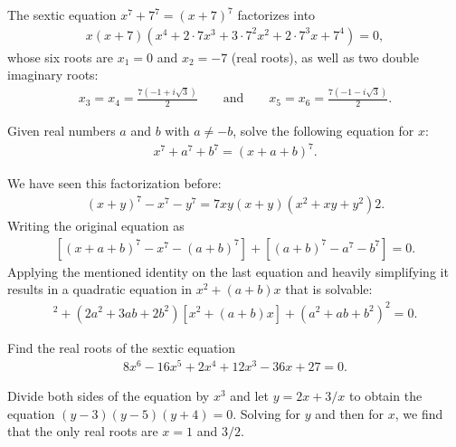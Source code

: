 \begin{solution}
    The sextic equation $x^7+7^7=(x+7)^7$ factorizes into
    \begin{align*}
        x(x+7)(x^4+2\cdot 7x^3 + 3 \cdot 7^2x^2 + 2 \cdot 7^3x + 7^4)=0,
    \end{align*}
    whose six roots are $x_1=0$ and $x_2=-7$ (real roots), as well as two double imaginary roots:
    \begin{align*}
        x_3=x_4=\frac{7(-1+i\sqrt 3)}{2} \qquad \text{and} \qquad x_5=x_6=\frac{7(-1-i\sqrt 3)}{2}.
    \end{align*}
\end{solution}

\begin{question}
    Given real numbers $a$ and $b$ with $a\neq -b$, solve the following equation for $x$:
    \begin{align*}
        x^7+a^7+b^7 = (x+a+b)^7.
    \end{align*}
\end{question}

\begin{solution}
    We have seen this factorization before:
    \begin{align*}
        (x+y)^7-x^7-y^7 = 7xy(x+y)(x^2+xy+y^2)2.
    \end{align*}
    Writing the original equation as
    \begin{align*}
        \left[(x+a+b)^7 - x^7 - (a+b)^7\right] + \left[(a+b)^7-a^7-b^7\right]=0.
    \end{align*}
    Applying the mentioned identity on the last equation and heavily simplifying it results in a quadratic equation in $x^2+(a+b)x$ that is solvable:
    \begin{align*}
        [x^2+(a+b)x]^2 + (2a^2+3ab+2b^2)[x^2+(a+b)x] + (a^2+ab+b^2)^2=0.
    \end{align*}
\end{solution}


\begin{question}
    Find the real roots of the sextic equation 
    \begin{align*}
        8x^6-16x^5+2x^4+12x^3-36x+27=0.
    \end{align*}
\end{question}

\begin{solution}
    Divide both sides of the equation by $x^3$ and let $y=2x+3/x$ to obtain the equation $(y-3)(y-5)(y+4)=0$. Solving for $y$ and then for $x$, we find that the only real roots are $x=1$ and $3/2$. 
\end{solution}

